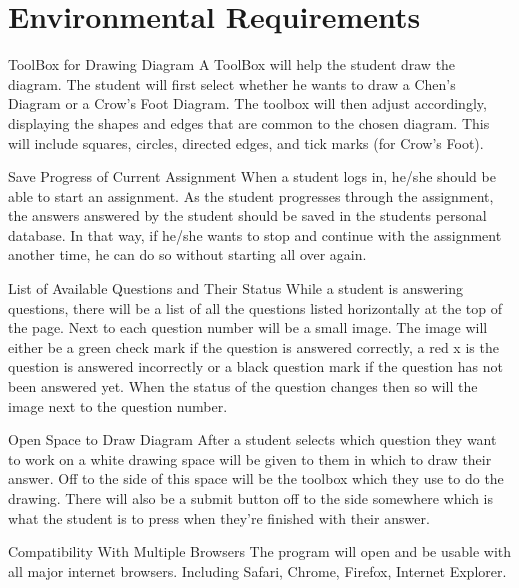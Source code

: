 \chapter{Environmental Requirements}


    \begin{section}{ToolBox for Drawing Diagram}
    A ToolBox will help the student draw the diagram. The student will first select whether he wants to draw a Chen's Diagram or a Crow's Foot Diagram. The toolbox will then adjust accordingly, displaying the shapes and edges that are common to the chosen diagram. This will include squares, circles, directed edges, and tick marks (for Crow's Foot).
    
    \end{section}
    
    \begin{section}{Save Progress of Current Assignment}
    When a student logs in, he/she should be able to start an assignment. As the student progresses through the assignment, the answers answered by the student should be saved in the students personal database. In that way, if he/she wants to stop and continue with the assignment another time, he can do so without starting all over again.
    \end{section}
    
    \begin{section}{List of Available Questions and Their Status}
    While a student is answering questions, there will be a list of all the questions listed horizontally at the top of the page.  Next to each question number will be a small image.  The image will either be a green check mark if the question is answered correctly, a red x is the question is answered incorrectly or a black question mark if the question has not been answered yet.  When the status of the question changes then so will the image next to the question number.
    \end{section}
    
    \begin{section}{Open Space to Draw Diagram}
    After a student selects which question they want to work on a white drawing space will be given to them in which to draw their answer. Off to the side of this space will be the toolbox which they use to do the drawing. There will also be a submit button off to the side somewhere which is what the student is to press when they're finished with their answer.
    \end{section}
    
    \begin{section}{Compatibility With Multiple Browsers}
    The program will open and be usable with all major internet browsers. Including Safari, Chrome, Firefox, Internet Explorer.
    \end{section}





